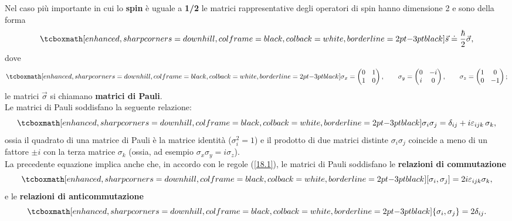 \documentclass[a4paper,12pt,oneside]{book}
\begin{document}
Nel caso più importante in cui lo \textbf{spin} è uguale a \textbf{1/2} le matrici rappresentative degli operatori di spin hanno dimensione 2 e sono della forma
	\begin{equation}
		\tcboxmath[enhanced, sharp corners=downhill, colframe=black, colback=white, borderline={2pt}{-3pt}{black}]{
			\vec{s}\doteq\frac{\hbar}{2}\vec{\sigma} ,
			}
	\end{equation}
dove
	\begin{equation}
		\tcboxmath[enhanced, sharp corners=downhill, colframe=black, colback=white, borderline={2pt}{-3pt}{black}]{
			\sigma_{x}=\begin{pmatrix}
			0 & 1 \\
			1 & 0
			\end{pmatrix}, \qquad \sigma_{y}=\begin{pmatrix}
			0 & -i \\
			i & 0
			\end{pmatrix},\qquad \sigma_{z}=\begin{pmatrix}
			1 & 0 \\
			0 & -1
			\end{pmatrix};
			}
	\end{equation}
le matrici $\vec{\sigma}$ si chiamano \textbf{matrici di Pauli}.\\

Le matrici di Pauli soddisfano la seguente relazione:
	\begin{equation}
		\tcboxmath[enhanced, sharp corners=downhill, colframe=black, colback=white, borderline={2pt}{-3pt}{black}]{
			\sigma _i \sigma _j = \delta _{ij} + i \varepsilon _{ijk}\, \sigma _k ,
			}
	\end{equation}
ossia il quadrato di una matrice di Pauli è la matrice identità ($\sigma _i ^2 =1$) e il prodotto di due matrici distinte $\sigma _i \sigma _j$ coincide a meno di un fattore $\pm i$ con la terza matrice $\sigma _k$ (ossia, ad esempio $\sigma _x \sigma _y = i \sigma _z$).\\

La precedente equazione implica anche che, in accordo con le regole (\ref{18.1}), le matrici di Pauli soddisfano le \textbf{relazioni di commutazione}
	\begin{equation}
		\tcboxmath[enhanced, sharp corners=downhill, colframe=black, colback=white, borderline={2pt}{-3pt}{black}]{
			[\sigma_{i}, \sigma_{j}]=2i\varepsilon_{ijk}\sigma_{k} ,
			}
	\end{equation}
e le \textbf{relazioni di anticommutazione}
	\begin{equation}
		\tcboxmath[enhanced, sharp corners=downhill, colframe=black, colback=white, borderline={2pt}{-3pt}{black}]{
			\lbrace\sigma_{i}, \sigma_{j}\rbrace=2\delta_{ij} .
			}
	\end{equation}\\
	
\end{document}
